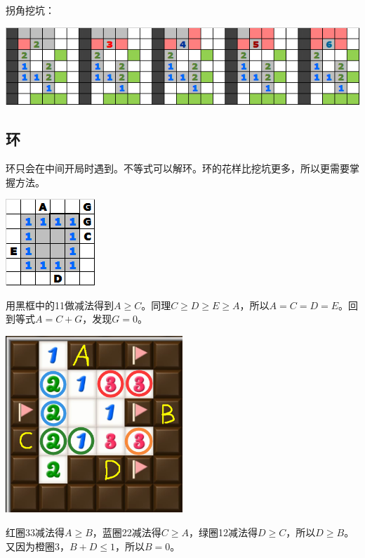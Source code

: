 \vspace{5mm}拐角挖坑：
\begin{center}
    \includegraphics[scale=0.6]{game/挖坑2.png}
\end{center}

\subsection{环}\label{cycle}
环只会在中间开局时遇到。不等式可以解环。环的花样比挖坑更多，所以更需要掌握方法。

\vspace{5mm}
\begin{center}
    \includegraphics{trick/环1.png}
\end{center}
用黑框中的11做减法得到$A\ge C$。同理$C\ge D\ge E\ge A$，所以$A=C=D=E$。回到等式$A=C+G$，发现$G=0$。

\vspace{5mm}
\begin{center}
    \includegraphics[width=0.5\textwidth]{trick/环2.png}
\end{center}
红圈33减法得$A\ge B$，蓝圈22减法得$C\ge A$，绿圈12减法得$D\ge C$，所以$D\ge B$。又因为橙圈3，$B+D\le 1$，所以$B=0$。

